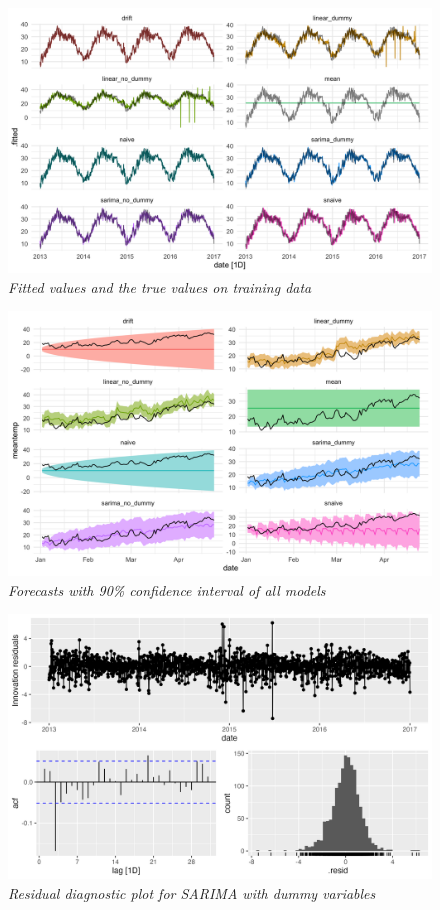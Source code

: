 \begin{figure}[!h]
    \centering
    \includegraphics[width=.8\textwidth]{images/fitted_values_all_models.png}
    \caption{\small \textit{Fitted values and the true values on training data}}
    \label{fig:figure1}
\end{figure}

\begin{figure}[!h]
    \centering
    \includegraphics[width=.8\textwidth]{images/forecasts_CI90.png}
    \caption{\small \textit{Forecasts with 90\% confidence interval of all models}}
    \label{fig:figure1}
\end{figure}

\begin{figure}[!h]
    \centering
    \includegraphics[width=.8\textwidth]{images/best_model_resid_diagnostic.png}
    \caption{\small \textit{Residual diagnostic plot for SARIMA with dummy variables}}
    \label{fig:figure1}
\end{figure}

